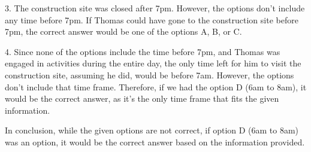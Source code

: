 3. The construction site was closed after 7pm. However, the options don't include any time before 7pm. If Thomas could have gone to the construction site before 7pm, the correct answer would be one of the options A, B, or C.

4. Since none of the options include the time before 7pm, and Thomas was engaged in activities during the entire day, the only time left for him to visit the construction site, assuming he did, would be before 7am. However, the options don't include that time frame. Therefore, if we had the option D (6am to 8am), it would be the correct answer, as it's the only time frame that fits the given information.

In conclusion, while the given options are not correct, if option D (6am to 8am) was an option, it would be the correct answer based on the information provided.